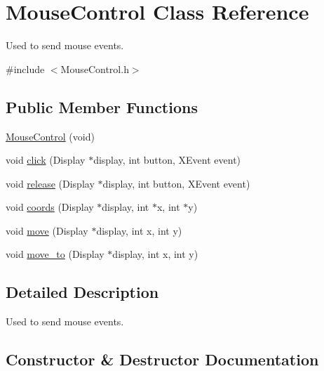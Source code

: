 \hypertarget{classMouseControl}{}\section{Mouse\+Control Class Reference}
\label{classMouseControl}


Used to send mouse events.  




{\ttfamily \#include $<$Mouse\+Control.\+h$>$}

\subsection*{Public Member Functions}
\begin{DoxyCompactItemize}
\item 
\hyperlink{classMouseControl_a16de792a08f8e9bbcb656ba0e434507c}{Mouse\+Control} (void)
\item 
void \hyperlink{classMouseControl_aef7670a46bf01b4a10767a9942dbdb79}{click} (Display $\ast$display, int button, X\+Event event)
\item 
void \hyperlink{classMouseControl_a0b2111e195e98133385cd559972fa779}{release} (Display $\ast$display, int button, X\+Event event)
\item 
void \hyperlink{classMouseControl_af69eee658d62f741ab71aa87fbfb75fc}{coords} (Display $\ast$display, int $\ast$x, int $\ast$y)
\item 
void \hyperlink{classMouseControl_a73a5e37468d8c1e7be8bcd1ac15c2135}{move} (Display $\ast$display, int x, int y)
\item 
void \hyperlink{classMouseControl_a067b9b5aab08ad63fef9dce22b45763f}{move\+\_\+to} (Display $\ast$display, int x, int y)
\end{DoxyCompactItemize}


\subsection{Detailed Description}
Used to send mouse events. 

\subsection{Constructor \& Destructor Documentation}
\mbox{\label{classMouseControl_a16de792a08f8e9bbcb656ba0e434507c}} 

